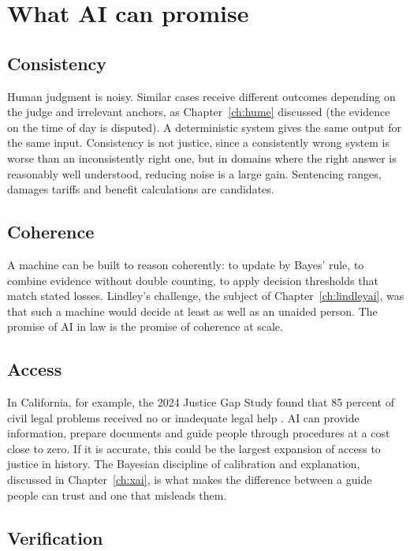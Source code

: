 \section{What AI can promise}

\subsection{Consistency}

Human judgment is noisy. Similar cases receive different outcomes depending on the judge and irrelevant anchors, as Chapter~\ref{ch:hume} discussed (the evidence on the time of day is disputed). A deterministic system gives the same output for the same input. Consistency is not justice, since a consistently wrong system is worse than an inconsistently right one, but in domains where the right answer is reasonably well understood, reducing noise is a large gain. Sentencing ranges, damages tariffs and benefit calculations are candidates.

\subsection{Coherence}

A machine can be built to reason coherently: to update by Bayes' rule, to combine evidence without double counting, to apply decision thresholds that match stated losses. Lindley's challenge, the subject of Chapter~\ref{ch:lindleyai}, was that such a machine would decide at least as well as an unaided person. The promise of AI in law is the promise of coherence at scale.

\subsection{Access}

In California, for example, the 2024 Justice Gap Study found that 85 percent of civil legal problems received no or inadequate legal help \citep{calbar2024}. AI can provide information, prepare documents and guide people through procedures at a cost close to zero. If it is accurate, this could be the largest expansion of access to justice in history. The Bayesian discipline of calibration and explanation, discussed in Chapter~\ref{ch:xai}, is what makes the difference between a guide people can trust and one that misleads them.

\subsection{Verification}

